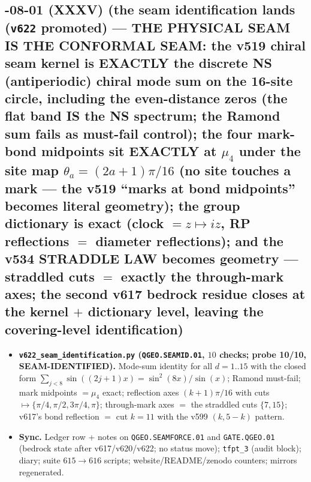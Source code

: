 \documentclass[11pt]{article}
\begin{document}
\subsection*{-08-01 (XXXV) (the seam identification lands (\texttt{v622} promoted) --- THE PHYSICAL SEAM IS THE CONFORMAL SEAM: the v519 chiral seam kernel is EXACTLY the discrete NS (antiperiodic) chiral mode sum on the 16-site circle, including the even-distance zeros (the flat band IS the NS spectrum; the Ramond sum fails as must-fail control); the four mark-bond midpoints sit EXACTLY at $\mu_4$ under the site map $\theta_a=(2a+1)\pi/16$ (no site touches a mark --- the v519 ``marks at bond midpoints'' becomes literal geometry); the group dictionary is exact (clock $=z\mapsto iz$, RP reflections $=$ diameter reflections); and the v534 STRADDLE LAW becomes geometry --- straddled cuts $=$ exactly the through-mark axes; the second v617 bedrock residue closes at the kernel $+$ dictionary level, leaving the covering-level identification)}
\begin{itemize}[leftmargin=1.5em]
\item \textbf{\texttt{v622\_seam\_identification.py} (\texttt{QGEO.SEAMID.01}, $10$ checks;
probe 10/10, SEAM-IDENTIFIED).} Mode-sum identity for all $d=1..15$ with the closed form
$\sum_{j<8}\sin((2j{+}1)x)=\sin^2(8x)/\sin(x)$; Ramond must-fail; mark midpoints $=\mu_4$
exact; reflection axes $(k{+}1)\pi/16$ with cuts $\mapsto\{\pi/4,\pi/2,3\pi/4,\pi\}$;
through-mark axes $=$ the straddled cuts $\{7,15\}$; v617's bond reflection $=$ cut
$k=11$ with the v599 $(k,5{-}k)$ pattern.
\item \textbf{Sync.} Ledger row + notes on \texttt{QGEO.SEAMFORCE.01} and
\texttt{GATE.QGEO.01} (bedrock state after v617/v620/v622; no status move);
\texttt{tfpt\_3} (audit block); diary; suite $615\to616$ scripts; website/README/zenodo
counters; mirrors regenerated.
\end{itemize}
\end{document}
